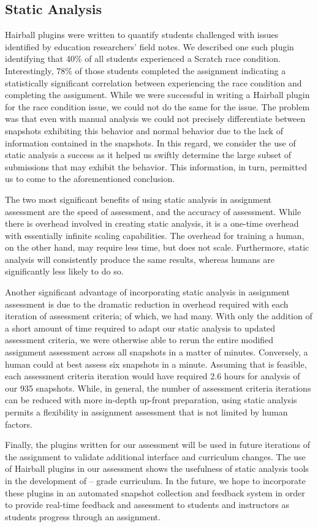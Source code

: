 \subsection{Static Analysis}
Hairball plugins were written to quantify students challenged with issues
identified by education researchers' field notes. We described one such plugin
identifying that 40\% of all students experienced a Scratch race
condition. Interestingly, 78\% of those students completed the assignment
indicating a statistically significant correlation between experiencing the
race condition and completing the assignment. While we were successful in
writing a Hairball plugin for the race condition issue, we could not do the
same for the \dce{} issue. The problem was that even with manual analysis we
could not precisely differentiate between snapshots exhibiting this behavior
and normal behavior due to the lack of information contained in the
snapshots. In this regard, we consider the use of static analysis a success as
it helped us swiftly determine the large subset of submissions that may exhibit
the \dce{} behavior. This information, in turn, permitted us to come to the
aforementioned conclusion.

The two most significant benefits of using static analysis in assignment
assessment are the speed of assessment, and the accuracy of assessment. While
there is overhead involved in creating static analysis, it is a one-time
overhead with essentially infinite scaling capabilities. The overhead for
training a human, on the other hand, may require less time, but does not
scale. Furthermore, static analysis will consistently produce the same results,
whereas humans are significantly less likely to do so.

Another significant advantage of incorporating static analysis in assignment
assessment is due to the dramatic reduction in overhead required with each
iteration of assessment criteria; of which, we had many. With only the addition
of a short amount of time required to adapt our static analysis to updated
assessment criteria, we were otherwise able to rerun the entire modified
assignment assessment across all snapshots in a matter of minutes. Conversely,
a human could at best assess six snapshots in a minute. Assuming that is
feasible, each assessment criteria iteration would have required 2.6 hours for
analysis of our 935 snapshots. While, in general, the number of assessment
criteria iterations can be reduced with more in-depth up-front preparation,
using static analysis permits a flexibility in assignment assessment that is
not limited by human factors.

Finally, the plugins written for our assessment will be used in future
iterations of the assignment to validate additional interface and curriculum
changes. The use of Hairball plugins in our assessment shows the usefulness of
static analysis tools in the development of -- grade
curriculum. In the future, we hope to incorporate these plugins in an automated
snapshot collection and feedback system in order to provide real-time feedback
and assessment to students and instructors as students progress through an
assignment.
